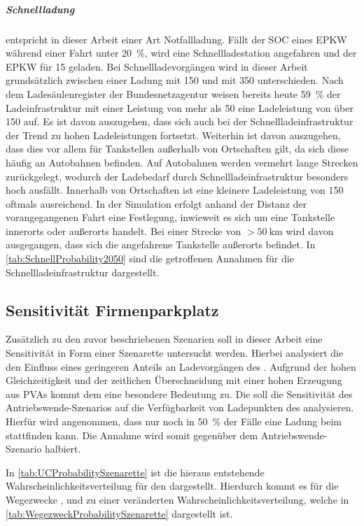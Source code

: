 \subparagraph{Schnellladung} entspricht in dieser Arbeit einer Art Notfallladung.
Fällt der \gls{SOC} eines \gls{EPKW} während einer Fahrt unter \SI{20}{\percent}, wird eine Schnellladestation angefahren und der \gls{EPKW} für \SI{15}{\Minuten} geladen.
Bei Schnellladevorgängen wird in dieser Arbeit grundsätzlich zwischen einer Ladung mit \SI{150}{\kw} und mit \SI{350}{\kw} unterschieden.
Nach dem Ladesäulenregister der Bundesnetzagentur \cite[][Stand: ]{BundesnetzagenturElektrizitaet2020} weisen bereits heute \SI{59}{\percent} der Ladeinfrastruktur mit einer Leistung von mehr als \SI{50}{\kw} eine Ladeleistung von über \SI{150}{\kw} auf.
Es ist davon auszugehen, dass sich auch bei der Schnellladeinfrastruktur der Trend zu hohen Ladeleistungen fortsetzt.
Weiterhin ist davon auszugehen, dass dies vor allem für Tankstellen außerhalb von Ortschaften gilt, da sich diese häufig an Autobahnen befinden.
Auf Autobahnen werden vermehrt lange Strecken zurückgelegt, wodurch der Ladebedarf durch Schnellladeinfrastruktur besonders hoch ausfällt.
Innerhalb von Ortschaften ist eine kleinere Ladeleistung von \SI{150}{\kw} oftmals ausreichend.
In der Simulation erfolgt anhand der Distanz der vorangegangenen Fahrt eine Festlegung, inwieweit es sich um eine Tankstelle innerorts oder außerorts handelt.
Bei einer Strecke von $> \SI{50}{\km}$ wird davon ausgegangen, dass sich die angefahrene Tankstelle außerorts befindet.
In \autoref{tab:SchnellProbability2050} sind die getroffenen Annahmen für die Schnellladeinfrastruktur dargestellt.




\subsection{Sensitivität Firmenparkplatz}

Zusätzlich zu den zuvor beschriebenen Szenarien soll in dieser Arbeit eine Sensitivität in Form einer Szenarette untersucht werden.
Hierbei analysiert die \SzeFirmenparkplatz den Einfluss eines geringeren Anteils an Ladevorgängen des \UC \Firmeparkplatzdot.
Aufgrund der hohen Gleichzeitigkeit und der zeitlichen Überschneidung mit einer hohen Erzeugung aus \glspl{PVA} kommt dem \UC \Firmeparkplatz eine besondere Bedeutung zu.
Die \SzeFirmenparkplatz soll die Sensitivität des Antriebswende-Szenarios auf die Verfügbarkeit von Ladepunkten des \UC \Firmeparkplatz analysieren.
Hierfür wird angenommen, dass nur noch in \SI{50}{\percent} der Fälle eine Ladung beim \UC \Firmeparkplatz stattfinden kann.
Die Annahme wird somit gegenüber dem Antriebswende-Szenario halbiert.



In \autoref{tab:UCProbabilitySzenarette} ist die hieraus entstehende Wahrscheinlichkeitsverteilung für den \UC \Firmeparkplatz dargestellt.
Hierdurch kommt es für die Wegezwecke \Arbeitdot, \dienst und \Ausbildung zu einer veränderten Wahrscheinlichkeitsverteilung, welche in \autoref{tab:WegezweckProbabilitySzenarette} dargestellt ist.




\clearpage
